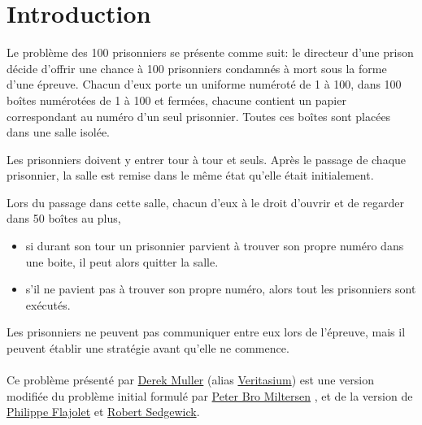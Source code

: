 \section{Introduction}

Le problème des 100 prisonniers \cite{100PrisonersProblem2023} se présente comme suit:
le directeur d'une prison décide d'offrir une chance à 100 prisonniers
condamnés à mort sous la forme d'une épreuve.
Chacun d'eux porte un uniforme numéroté de 1 à 100, dans 100 boîtes
numérotées de 1 à 100 et fermées, chacune contient un papier correspondant
au numéro d'un seul prisonnier.
Toutes ces boîtes sont placées dans une salle isolée.

Les prisonniers doivent y entrer tour à tour et seuls.
Après le passage de chaque prisonnier, la salle est remise dans le même
état qu'elle était initialement.

Lors du passage dans cette salle, chacun d'eux à le droit d'ouvrir
et de regarder dans 50 boîtes au plus,

\begin{itemize}
	\item
	      si durant son tour un prisonnier parvient à trouver son propre numéro
	      dans une boite, il peut alors quitter la salle.
	\item
	      s'il ne pavient pas à trouver son propre numéro, alors tout les
	      prisonniers sont exécutés.
\end{itemize}

Les prisonniers ne peuvent pas communiquer entre eux lors de l'épreuve,
mais il peuvent établir une stratégie avant qu'elle ne commence.\\\\
Ce problème présenté \cite{veritasiumRiddleThatSeems2022} par
\href{https://fr.wikipedia.org/wiki/Derek_Muller}{Derek Muller}
(alias \href{https://www.youtube.com/@veritasium}{Veritasium})
est une version modifiée du problème
initial \cite{miltersenCellProbeComplexity2007} formulé par
\href{https://pure.au.dk/portal/en/persons/bromille%40cs.au.dk}{Peter Bro Miltersen}
, et de la version \cite{flajoletAnalyticCombinatorics2009} de
\href{https://fr.wikipedia.org/wiki/Philippe_Flajolet}{Philippe Flajolet}
et \href{https://en.wikipedia.org/wiki/Robert_Sedgewick_(computer_scientist)}{Robert Sedgewick}.
